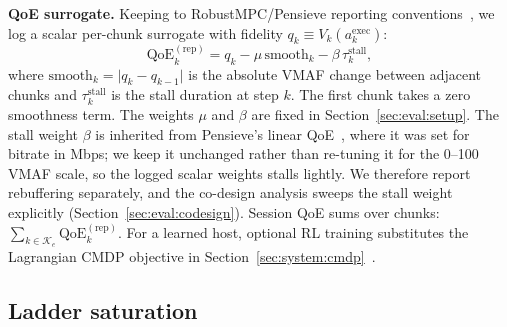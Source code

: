 \textbf{QoE surrogate.}
Keeping to RobustMPC/Pensieve reporting conventions~\cite{yin2015control,mao2017neural}, we log a scalar per-chunk surrogate with fidelity \(q_k \equiv V_k\!\left(a^{\mathrm{exec}}_k\right)\):
\begin{equation}
\label{eq:qoe-rep}
    \mathrm{QoE}^{\mathrm{(rep)}}_{k} = q_k - \mu\, \text{smooth}_k - \beta\, \tau^{\mathrm{stall}}_k,
\end{equation}
where \(\text{smooth}_k=\lvert q_k-q_{k-1}\rvert\) is the absolute VMAF change between adjacent chunks and \(\tau^{\mathrm{stall}}_k\) is the stall duration at step \(k\).
The first chunk takes a zero smoothness term.
The weights \(\mu\) and \(\beta\) are fixed in Section~\ref{sec:eval:setup}.
The stall weight \(\beta\) is inherited from Pensieve's linear QoE~\cite{mao2017neural}, where it was set for bitrate in Mbps; we keep it unchanged rather than re-tuning it for the 0--100 VMAF scale, so the logged scalar weights stalls lightly. We therefore report rebuffering separately, and the co-design analysis sweeps the stall weight explicitly (Section~\ref{sec:eval:codesign}).
Session QoE sums over chunks: \(\sum_{k\in\mathcal{K}_e}\mathrm{QoE}^{\mathrm{(rep)}}_{k}\).
For a learned host, optional RL training substitutes the Lagrangian CMDP objective in Section~\ref{sec:system:cmdp}~\cite{altman1999constrained,paternain2019dual}.

\subsection{Ladder saturation}
\label{sec:system:ladder}

